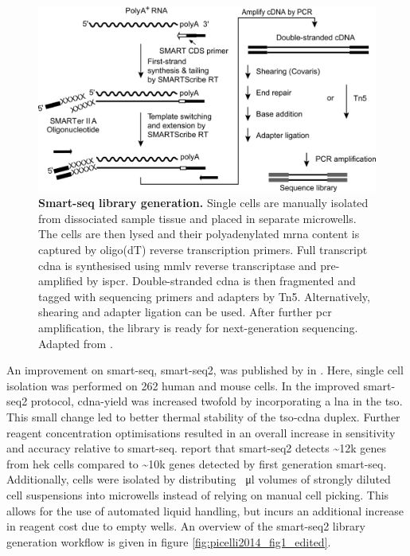\begin{figure}[ht]
	\centerfloat
	\includegraphics[width=\textwidth]{./ims/ramskold2012.png}
	\caption[Smart-seq library generation]{\textbf{Smart-seq library generation.} Single cells are manually isolated from dissociated sample tissue and placed in separate microwells. The cells are then lysed and their polyadenylated \acrshort{mrna} content is captured by oligo(dT) reverse transcription primers. Full transcript \acrshort{cdna} is synthesised using \acrshort{mmlv} reverse transcriptase and pre-amplified by \acrshort{ispcr}. Double-stranded \acrshort{cdna} is then fragmented and tagged with sequencing primers and adapters by Tn5. Alternatively, shearing and adapter ligation can be used. After further \acrshort{pcr} amplification, the library is ready for next-generation sequencing. Adapted from \citealp{ramskold2012}.}
	\label{fig:ramskold2012}
\end{figure}

An improvement on \acrshort{smart-seq}, \acrshort{smart-seq}2, was published by \citeauthor{picelli2013} in \citeyear{picelli2013}. Here, single cell isolation was performed on 262 human and mouse cells. In the improved \acrshort{smart-seq}2 protocol, \acrshort{cdna}-yield was increased twofold by incorporating a \acrfull{lna} in the \acrshort{tso}. This small change led to better thermal stability of the \acrshort{tso}-\acrshort{cdna} duplex. Further reagent concentration optimisations resulted in an overall increase in sensitivity and accuracy relative to \acrshort{smart-seq}. \citeauthor{picelli2013} report that \acrshort{smart-seq}2 detects \textasciitilde{}12k genes from \acrshort{hek} cells compared to \textasciitilde{10k} genes detected by first generation \acrshort{smart-seq}. Additionally, cells were isolated by distributing \SI{}{\micro\litre} volumes of strongly diluted cell suspensions into microwells instead of relying on manual cell picking. This allows for the use of automated liquid handling, but incurs an additional increase in reagent cost due to empty wells. An overview of the \acrshort{smart-seq}2 library generation workflow is given in figure \ref{fig:picelli2014_fig1_edited}.\pms

